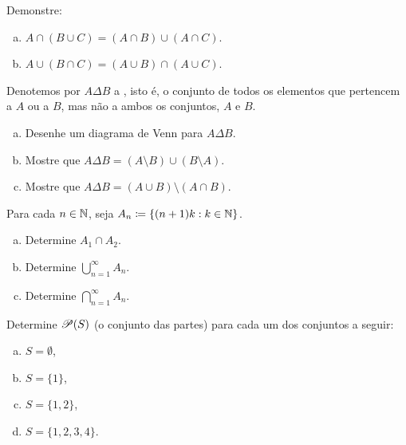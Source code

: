 \begin{exercise}
Demonstre:
\begin{enumerate}[a)]
\item $A \cap (B \cup C) = (A \cap B) \cup (A \cap C)$.
\item $A \cup (B \cap C) = (A \cup B) \cap (A \cup C)$.
\end{enumerate}
\end{exercise}

\begin{samepage}
\begin{exercise}
Denotemos por $A \Delta B$ a
\emph{}, isto é, o conjunto de todos os elementos que
pertencem a $A$ ou a $B$, mas não a ambos os conjuntos, $A$ e $B$.
\begin{enumerate}[a)]
\item
Desenhe um diagrama de Venn para
$A \Delta B$.
\item
Mostre que $A \Delta B = (A \setminus B) \cup (B \setminus A)$.
\item
Mostre que $A \Delta B = (A \cup B) \setminus ( A \cap B)$.
\end{enumerate}
\end{exercise}
\end{samepage}

\begin{exercise}
Para cada $n \in {\mathbb{N}}$, seja $A_n \coloneqq \{ (n+1)k : k \in {\mathbb{N}} \}$.
\begin{enumerate}[a)]
\item Determine $A_1 \cap A_2$.
\item Determine $\bigcup_{n=1}^\infty A_n$.
\item Determine $\bigcap_{n=1}^\infty A_n$.
\end{enumerate}
\end{exercise}

\begin{samepage}
\begin{exercise}
Determine ${\mathscr{P}}(S)$ (o conjunto das partes) para cada um dos conjuntos a seguir:
\begin{enumerate}[a)]
\item $S = \emptyset$,
\item $S = \{1\}$,
\item $S = \{1,2\}$,
\item $S = \{1,2,3,4\}$.
\end{enumerate}
\end{exercise}
\end{samepage}



